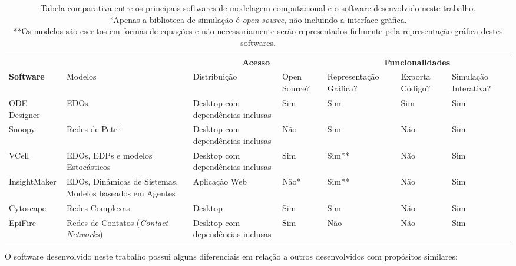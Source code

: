 \documentclass[
	12pt,				%
	openright,			%
	oneside,			%
	a4paper,			%
	main=brazil,
	english,			%
	]{ufsj-abntex2}
\begin{document}
\begin{landscape}
\begin{table}[h]
    \centering
        \begin{tabular}{m{}m{}m{}m{}m{}m{}m{}}
        \toprule
        \multicolumn{1}{c}{} & \multicolumn{1}{c}{} & \multicolumn{2}{c}{\textbf{Acesso}} & \multicolumn{3}{c}{\textbf{Funcionalidades}} \\
        \cmidrule(rl){3-4}\cmidrule(rl){5-7}
        \textbf{Software} & {Modelos} & {Distribuição} & {Open Source?} & {Representação Gráfica?} & {Exporta Código?} & {Simulação Interativa?} \\
        \midrule
        ODE Designer & EDOs & Desktop com dependências inclusas & Sim & Sim & Sim & Sim \\
        Snoopy & Redes de Petri & Desktop com dependências inclusas & Não & Sim & Não & Sim \\
        VCell & EDOs, EDPs e modelos Estocásticos & Desktop com dependências inclusas & Sim & Sim** & Não & Sim \\
        InsightMaker & EDOs, Dinâmicas de Sistemas, Modelos baseados em Agentes & Aplicação Web & Não* & Sim** & Não & Sim \\
        Cytoscape & Redes Complexas & Desktop & Sim & Sim & Não & Sim \\
        EpiFire & Redes de Contatos (\textit{Contact Networks}) & Desktop com dependências inclusas & Sim & Não & Não & Sim \\
        \bottomrule
    \end{tabular}
    \caption{Tabela comparativa entre os principais softwares de modelagem computacional e o software desenvolvido neste trabalho. \\ *Apenas a biblioteca de simulação é \textit{open source}, não incluindo a interface gráfica. \\ **Os modelos são escritos em formas de equações e não necessariamente serão representados fielmente pela representação gráfica destes softwares.}
    \label{tab:comparativo}
\end{table}
\end{landscape}

O software desenvolvido neste trabalho possui alguns diferenciais em relação a outros desenvolvidos com propósitos similares:
\end{document}
